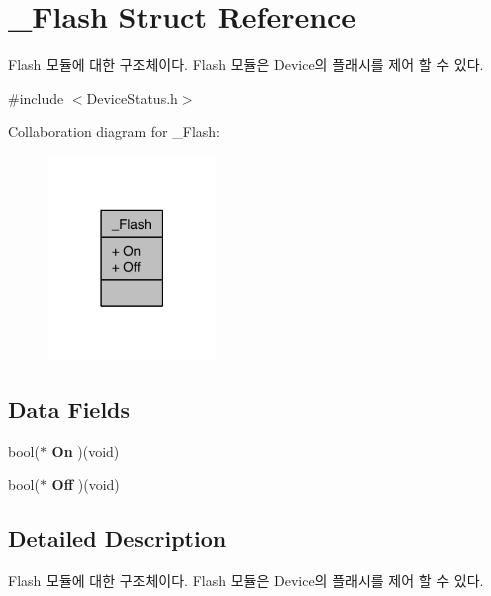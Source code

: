 \hypertarget{struct__Flash}{\section{\-\_\-\-Flash Struct Reference}
\label{struct__Flash}
}


Flash 모듈에 대한 구조체이다. Flash 모듈은 Device의 플래시를 제어 할 수 있다.  




{\ttfamily \#include $<$Device\-Status.\-h$>$}



Collaboration diagram for \-\_\-\-Flash\-:\nopagebreak
\begin{figure}[H]
\begin{center}
\leavevmode
\includegraphics[width=126pt]{da/d34/struct__Flash__coll__graph}
\end{center}
\end{figure}
\subsection*{Data Fields}
\begin{DoxyCompactItemize}
\item 
\hypertarget{struct__Flash_ae123319afef15c36b1d52f41184e2387}{bool($\ast$ {\bfseries On} )(void)}\label{struct__Flash_ae123319afef15c36b1d52f41184e2387}

\item 
\hypertarget{struct__Flash_a9cba109cd9391d9c09b3a7b46a345dad}{bool($\ast$ {\bfseries Off} )(void)}\label{struct__Flash_a9cba109cd9391d9c09b3a7b46a345dad}

\end{DoxyCompactItemize}


\subsection{Detailed Description}
Flash 모듈에 대한 구조체이다. Flash 모듈은 Device의 플래시를 제어 할 수 있다. 

